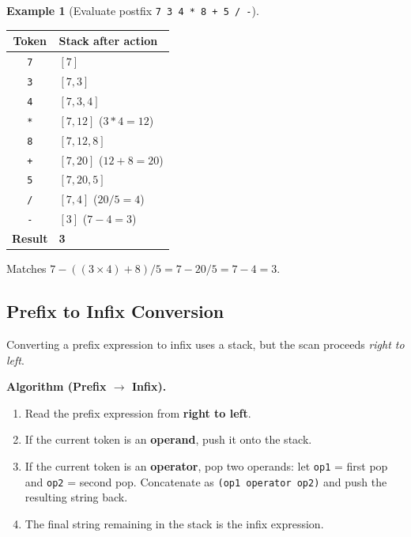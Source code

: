 \documentclass[11pt, a4paper, notitlepage]{report}
\theoremstyle{definition}
\theoremstyle{remark}
\theoremstyle{definition}
\newtheorem{example}[theorem]{Example}
\begin{document}
\begin{example}[Evaluate postfix \texttt{7 3 4 * 8 + 5 / -}]
\label{ex:eval-postfix-full}

\begin{center}
\begin{tabular}{@{} c l @{}}
\toprule
\textbf{Token} & \textbf{Stack after action} \\
\midrule
\texttt{7} & $[7]$ \\
\texttt{3} & $[7, 3]$ \\
\texttt{4} & $[7, 3, 4]$ \\
\texttt{*} & $[7, 12]$ \quad ($3*4=12$) \\
\texttt{8} & $[7, 12, 8]$ \\
\texttt{+} & $[7, 20]$ \quad ($12+8=20$) \\
\texttt{5} & $[7, 20, 5]$ \\
\texttt{/} & $[7, 4]$ \quad ($20/5=4$) \\
\texttt{-} & $[3]$ \quad ($7-4=3$) \\
\midrule
\textbf{Result} & \textbf{3} \\
\bottomrule
\end{tabular}
\end{center}

Matches $7 - ((3 \times 4) + 8) / 5 = 7 - 20/5 = 7 - 4 = 3$.
\end{example}

\subsection{Prefix to Infix Conversion}
\label{subsec:prefix-to-infix}

Converting a prefix expression to infix uses a stack, but the scan proceeds
\emph{right to left}.

\textbf{Algorithm (Prefix $\to$ Infix).}

\begin{enumerate}
  \item Read the prefix expression from \textbf{right to left}.
  \item If the current token is an \textbf{operand}, push it onto the stack.
  \item If the current token is an \textbf{operator}, pop two operands: let
        \texttt{op1} = first pop and \texttt{op2} = second pop.  Concatenate as
        \texttt{(op1 operator op2)} and push the resulting string back.
  \item The final string remaining in the stack is the infix expression.
\end{enumerate}
\end{document}
